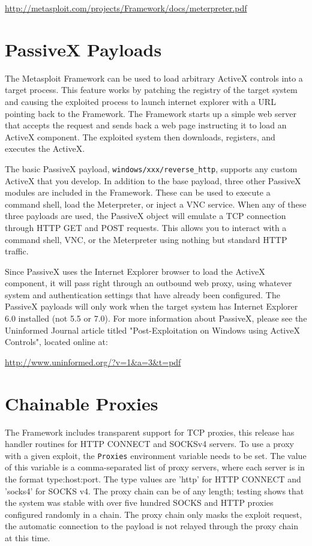 \documentclass{report}
\begin{document}
\url{http://metasploit.com/projects/Framework/docs/meterpreter.pdf}

\section{PassiveX Payloads}

\par The Metasploit Framework can be used to
load arbitrary ActiveX controls into a target process. This feature works by
patching the registry of the target system and causing the exploited process
to launch internet explorer with a URL pointing back to the Framework. The
Framework starts up a simple web server that accepts the request and sends
back a web page instructing it to load an ActiveX component. The exploited
system then downloads, registers, and executes the ActiveX. 

\par
The basic PassiveX payload, \texttt{windows/xxx/reverse\_http}, supports any
custom ActiveX that you develop. In addition to the base payload, three other
PassiveX modules are included in the Framework. These can be used to execute a
command shell, load the Meterpreter, or inject a VNC service. When any of
these three payloads are used, the PassiveX object will emulate a TCP
connection through HTTP GET and POST requests. This allows you to interact
with a command shell, VNC, or the Meterpreter using nothing but standard HTTP
traffic.

\par
Since PassiveX uses the Internet Explorer browser to load the ActiveX
component, it will pass right through an outbound web proxy, using whatever
system and authentication settings that have already been configured. The
PassiveX payloads will only work when the target system has Internet Explorer
6.0 installed (not 5.5 or 7.0). For more information about PassiveX,
please see the Uninformed Journal article titled "Post-Exploitation on Windows
using ActiveX Controls", located online at:

\url{http://www.uninformed.org/?v=1&a=3&t=pdf}

\section{Chainable Proxies}
\par
The Framework includes transparent support for TCP proxies, this release has
handler routines for HTTP CONNECT and SOCKSv4 servers. To use a proxy with a
given exploit, the \texttt{Proxies} environment variable needs to be set. The value of
this variable is a comma-separated list of proxy servers, where each server is
in the format type:host:port. The type values are 'http' for HTTP CONNECT and
'socks4' for SOCKS v4. The proxy chain can be of any length; testing shows that
the system was stable with over five hundred SOCKS and HTTP proxies configured
randomly in a chain. The proxy chain only masks the exploit request, the
automatic connection to the payload is not relayed through the proxy chain at
this time. 
\end{document}
